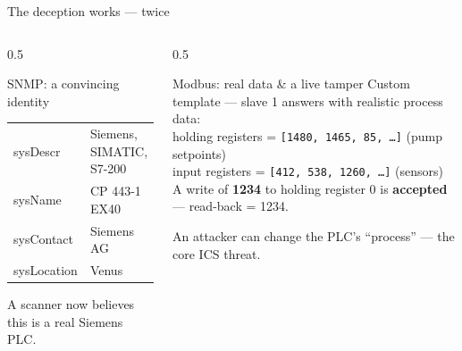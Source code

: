 \documentclass[aspectratio=169,11pt]{beamer}
\begin{document}
\begin{frame}{The deception works --- twice}
  \begin{columns}[T]
    \begin{column}{0.5\textwidth}
      \begin{block}{SNMP: a convincing identity}
        \small
        \begin{tabular}{@{}ll@{}}
          sysDescr    & Siemens, SIMATIC, S7-200 \\
          sysName     & CP 443-1 EX40 \\
          sysContact  & Siemens AG \\
          sysLocation & Venus \\
        \end{tabular}
      \end{block}
      {\footnotesize A scanner now believes this is a real Siemens PLC.}
    \end{column}
    \begin{column}{0.5\textwidth}
      \begin{block}{Modbus: real data \& a live tamper}
        \small
        Custom template --- slave 1 answers with realistic process data:\\[3pt]
        holding registers = \texttt{[1480, 1465, 85, \dots]} (pump setpoints)\\[2pt]
        input registers = \texttt{[412, 538, 1260, \dots]} (sensors)\\[4pt]
        A write of \textbf{1234} to holding register 0 is \textcolor{hpred}{\textbf{accepted}}
        --- read-back = 1234.
      \end{block}
      {\footnotesize An attacker can change the PLC's ``process'' --- the core ICS threat.}
    \end{column}
  \end{columns}
\end{frame}

\end{document}
